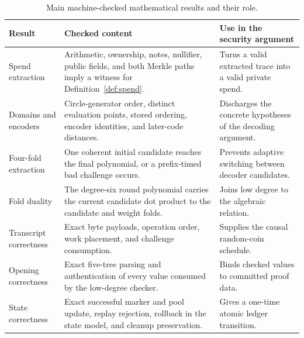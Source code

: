 \begin{table}[t]
\centering
\small
\caption{Main machine-checked mathematical results and their role.}
\label{tab:formal-results}
\begin{tabularx}{\textwidth}{@{}R{0.22\textwidth}YY@{}}
\toprule
Result & Checked content & Use in the security argument \\
\midrule
Spend extraction & Arithmetic, ownership, notes, nullifier, public fields,
and both Merkle paths imply a witness for Definition~\ref{def:spend}. & Turns a valid
extracted trace into a valid private spend. \\
Domains and encoders & Circle-generator order, distinct evaluation points,
stored ordering, encoder identities, and later-code distances. & Discharges
the concrete hypotheses of the decoding argument. \\
Four-fold extraction & One coherent initial candidate reaches the final
polynomial, or a prefix-timed bad challenge occurs. & Prevents adaptive
switching between decoder candidates. \\
Fold duality & The degree-six round polynomial carries the current candidate
dot product to the candidate and weight folds. & Joins low degree to the
algebraic relation. \\
Transcript correctness & Exact byte payloads, operation order, work placement,
and challenge consumption. & Supplies the causal random-coin schedule. \\
Opening correctness & Exact five-tree parsing and authentication of every
value consumed by the low-degree checker. & Binds checked values to committed
proof data. \\
State correctness & Exact successful marker and pool update, replay rejection,
rollback in the state model, and cleanup preservation. & Gives a one-time
atomic ledger transition. \\
\bottomrule
\end{tabularx}
\end{table}
